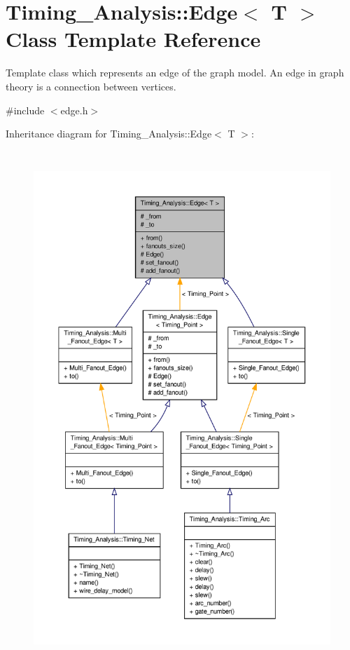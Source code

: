\hypertarget{classTiming__Analysis_1_1Edge}{\section{Timing\-\_\-\-Analysis\-:\-:Edge$<$ T $>$ Class Template Reference}
\label{classTiming__Analysis_1_1Edge}
}


Template class which represents an edge of the graph model. An edge in graph theory is a connection between vertices.  




{\ttfamily \#include $<$edge.\-h$>$}



Inheritance diagram for Timing\-\_\-\-Analysis\-:\-:Edge$<$ T $>$\-:\nopagebreak
\begin{figure}[H]
\begin{center}
\leavevmode
\includegraphics[height=550pt]{classTiming__Analysis_1_1Edge__inherit__graph}
\end{center}
\end{figure}


